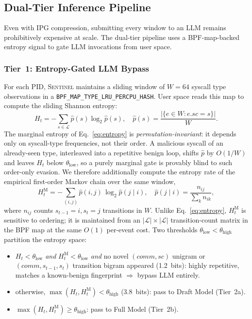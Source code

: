 \documentclass[journal]{IEEEtran}
\newcommand{\sentinel}{\textsc{Sentinel}}
\newcommand{\ipg}{IPG}
\begin{document}
\subsection{Dual-Tier Inference Pipeline}\label{sec:pipeline}

Even with \ipg{} compression, submitting every window to an LLM remains
prohibitively expensive at scale.  The dual-tier pipeline uses a BPF-map-backed
entropy signal to gate LLM invocations from user space.

\subsubsection*{Tier~1: Entropy-Gated LLM Bypass}
For each PID, \sentinel{} maintains a sliding window of $W=64$ syscall type
observations in a \texttt{BPF\_MAP\_TYPE\_LRU\_PERCPU\_HASH}.  User space reads
this map to compute the sliding Shannon entropy:
\begin{equation}
H_t = -\sum_{s \in \mathcal{L}} \hat{p}(s)\log_2 \hat{p}(s), \quad
\hat{p}(s) = \frac{|\{e \in W : e.\textit{sc} = s\}|}{W}.
\label{eq:entropy}
\end{equation}
The marginal entropy of Eq.~\eqref{eq:entropy} is
\emph{permutation-invariant}: it depends only on syscall-type frequencies,
not their order.  A malicious syscall of an already-seen type, interleaved
into a repetitive benign loop, shifts $\hat{p}$ by $O(1/W)$ and leaves $H_t$
below $\theta_{\text{low}}$, so a purely marginal gate is provably blind to
such order-only evasion.  We therefore additionally compute the entropy rate
of the empirical first-order Markov chain over the same window,
\begin{equation}
H_t^{\mathrm{M}} = -\!\!\sum_{(i,j)} \hat{p}(i,j)\,
  \log_2 \hat{p}(j \mid i), \quad
\hat{p}(j \mid i) = \frac{n_{ij}}{\sum_{k} n_{ik}},
\label{eq:markov}
\end{equation}
where $n_{ij}$ counts $s_{t-1}{=}i, s_t{=}j$ transitions in $W$.  Unlike
Eq.~\eqref{eq:entropy}, $H_t^{\mathrm{M}}$ is sensitive to ordering; it is
maintained from an $|\mathcal{L}|\times|\mathcal{L}|$ transition-count
matrix in the BPF map at the same $O(1)$ per-event cost.  Two thresholds
$\theta_{\text{low}} < \theta_{\text{high}}$ partition the entropy space:
\begin{itemize}
  \item $H_t < \theta_{\text{low}}$ \emph{and} $H_t^{\mathrm{M}} <
        \theta_{\text{low}}$ \emph{and} no novel
        $(\textit{comm},\textit{sc})$ unigram or
        $(\textit{comm}, s_{t-1}, s_t)$ transition bigram appeared
        (1.2~bits): highly repetitive, matches a known-benign fingerprint
        $\Rightarrow$ bypass LLM entirely.
  \item otherwise, $\max(H_t, H_t^{\mathrm{M}}) < \theta_{\text{high}}$
        (3.8~bits): pass to Draft Model (Tier~2a).
  \item $\max(H_t, H_t^{\mathrm{M}}) \geq \theta_{\text{high}}$: pass to
        Full Model (Tier~2b).
\end{itemize}
\end{document}
